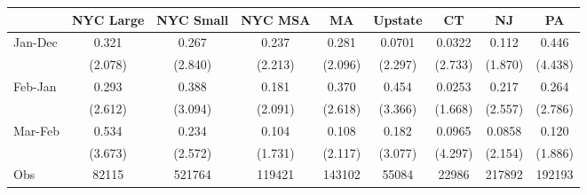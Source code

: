 {
\def\sym#1{\ifmmode^{#1}\else\(^{#1}\)\fi}
\begin{tabular}{l*{8}{c}}
\hline\hline
                    &\multicolumn{1}{c}{NYC Large}&\multicolumn{1}{c}{NYC Small}&\multicolumn{1}{c}{NYC MSA}&\multicolumn{1}{c}{MA}&\multicolumn{1}{c}{Upstate}&\multicolumn{1}{c}{CT}&\multicolumn{1}{c}{NJ}&\multicolumn{1}{c}{PA}\\
\hline
Jan-Dec             &       0.321         &       0.267         &       0.237         &       0.281         &      0.0701         &      0.0322         &       0.112         &       0.446         \\
                    &     (2.078)         &     (2.840)         &     (2.213)         &     (2.096)         &     (2.297)         &     (2.733)         &     (1.870)         &     (4.438)         \\
[1em]
Feb-Jan             &       0.293         &       0.388         &       0.181         &       0.370         &       0.454         &      0.0253         &       0.217         &       0.264         \\
                    &     (2.612)         &     (3.094)         &     (2.091)         &     (2.618)         &     (3.366)         &     (1.668)         &     (2.557)         &     (2.786)         \\
[1em]
Mar-Feb             &       0.534         &       0.234         &       0.104         &       0.108         &       0.182         &      0.0965         &      0.0858         &       0.120         \\
                    &     (3.673)         &     (2.572)         &     (1.731)         &     (2.117)         &     (3.077)         &     (4.297)         &     (2.154)         &     (1.886)         \\
\hline
Obs        &       82115         &      521764         &      119421         &      143102         &       55084         &       22986         &      217892         &      192193         \\
\hline\hline
\end{tabular}
}
